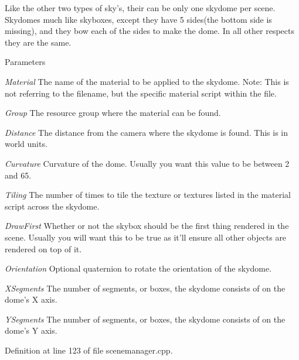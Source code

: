 Like the other two types of sky's, their can be only one skydome per scene. Skydomes much like skyboxes, except they have 5 sides(the bottom side is missing), and they bow each of the sides to make the dome. In all other respects they are the same. 
\begin{DoxyParams}{Parameters}
\item[{\em Material}]The name of the material to be applied to the skydome. Note: This is not referring to the filename, but the specific material script within the file. \item[{\em Group}]The resource group where the material can be found. \item[{\em Distance}]The distance from the camera where the skydome is found. This is in world units. \item[{\em Curvature}]Curvature of the dome. Usually you want this value to be between 2 and 65. \item[{\em Tiling}]The number of times to tile the texture or textures listed in the material script across the skydome. \item[{\em DrawFirst}]Whether or not the skybox should be the first thing rendered in the scene. Usually you will want this to be true as it'll ensure all other objects are rendered on top of it. \item[{\em Orientation}]Optional quaternion to rotate the orientation of the skydome. \item[{\em XSegments}]The number of segments, or boxes, the skydome consists of on the dome's X axis. \item[{\em YSegments}]The number of segments, or boxes, the skydome consists of on the dome's Y axis. \end{DoxyParams}


Definition at line 123 of file scenemanager.cpp.

